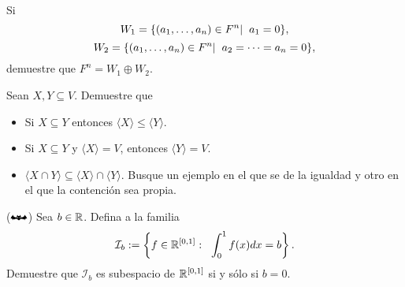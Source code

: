 \begin{ej}
Si
\[
W_{1} = \{ (a_{1}, \ldots , a_{n}) \in F^{n}  | \hspace{0.2cm} 
a_{1} = 0 \},
\]
\[
W_{2} = \{ (a_{1}, \ldots , a_{n}) \in F^{n}  | \hspace{0.2cm} 
a_{2} = \cdots = a_{n} = 0 \},
\]
demuestre que $F^{n} = W_{1} \oplus W_{2}$.
\end{ej}


\begin{ej}
Sean $X, Y \subseteq V$. Demuestre que
\begin{itemize}
	\item Si $X \subseteq Y$ entonces $\langle X \rangle \leq 
	\langle Y \rangle$.
	\item Si $X \subseteq Y$ y $\langle X \rangle = V$,
	entonces $\langle Y \rangle = V$.
	\item $\langle X \cap Y \rangle \subseteq \langle X 
	\rangle \cap \langle Y \rangle$. Busque un ejemplo en el que
	se de la igualdad y otro en el que la contención sea propia.
\end{itemize}
\end{ej}

\begin{ej} ($\mathbat$)
Sea $b \in \mathbb{R}$. Defina a la familia
\[
\mathcal{I}_{b} := \left\{
f \in \mathbb{R}^{[0, 1]}: \hspace{0.2cm}
\int_{0}^{1} f(x) dx = b
\right\}.
\]
Demuestre que $\mathcal{I}_{b}$ es subespacio de $\mathbb{R}^{[0,1]}$
si y sólo si $b = 0$.
\end{ej}

